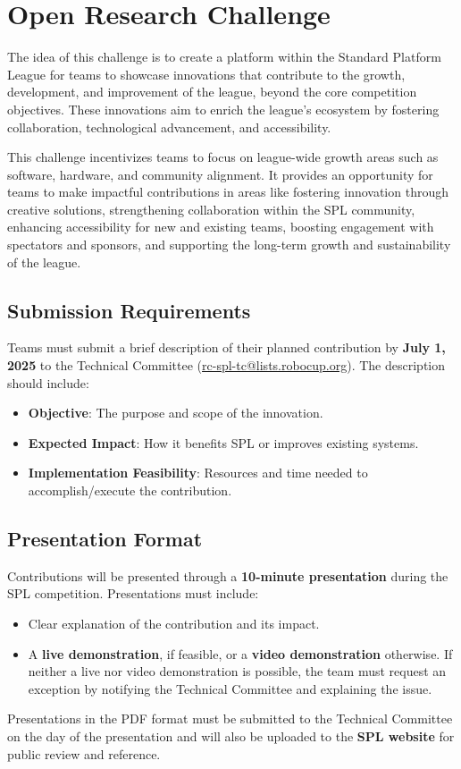 \section{Open Research Challenge}
The idea of this challenge is to create a platform within the Standard Platform League for teams to showcase innovations that contribute to the growth, development, and improvement of the league, beyond the core competition objectives. These innovations aim to enrich the league's ecosystem by fostering collaboration, technological advancement, and accessibility.

This challenge incentivizes teams to focus on league-wide growth areas such as software, hardware, and community alignment. It provides an opportunity for teams to make impactful contributions in areas like fostering innovation through creative solutions, strengthening collaboration within the SPL community, enhancing accessibility for new and existing teams, boosting engagement with spectators and sponsors, and supporting the long-term growth and sustainability of the league.

\subsection{Submission Requirements}
Teams must submit a brief description of their planned contribution by \textbf{July 1, 2025} to the Technical Committee (\url{rc-spl-tc@lists.robocup.org}).
The description should include:
    \begin{itemize}
        \item \textbf{Objective}: The purpose and scope of the innovation.
        \item \textbf{Expected Impact}: How it benefits SPL or improves existing systems.
        \item \textbf{Implementation Feasibility}: Resources and time needed to accomplish/execute the contribution.
    \end{itemize}

\subsection{Presentation Format}
Contributions will be presented through a \textbf{10-minute presentation} during the SPL competition.
Presentations must include:
\begin{itemize}
    \item Clear explanation of the contribution and its impact.
    \item A \textbf{live demonstration}, if feasible, or a \textbf{video demonstration} otherwise. If neither a live nor video demonstration is possible, the team must request an exception by notifying the Technical Committee and explaining the issue.
\end{itemize}
Presentations in the PDF format must be submitted to the Technical Committee on the day of the presentation and will also be uploaded to the \textbf{SPL website} for public review and reference.


